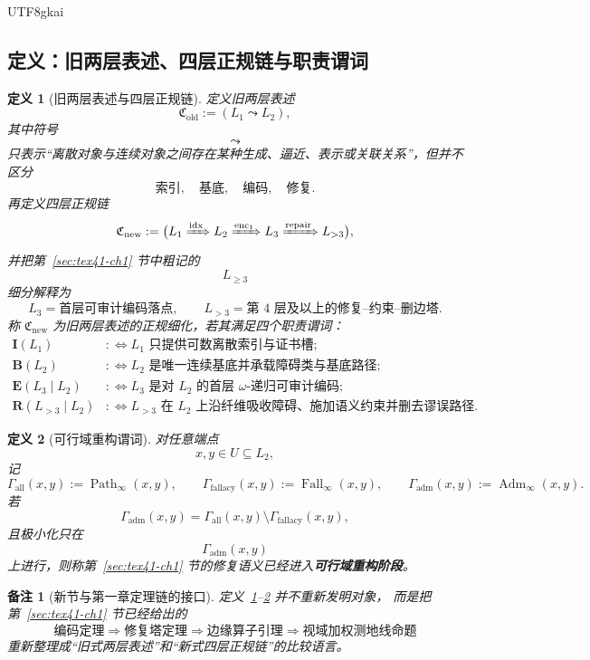 \documentclass[12pt]{article}
\newtheorem{definition}{定义}[section]
\newtheorem{remark}{备注}[section]
\newcommand{\Fall}{\operatorname{Fall}}
\newcommand{\Adm}{\operatorname{Adm}}
\newcommand{\Path}{\operatorname{Path}}
\begin{document}
\begin{CJK*}{UTF8}{gkai}
\subsection{定义：旧两层表述、四层正规链与职责谓词}
\label{subsec:tex41-upgrade-defs}

\begin{definition}[旧两层表述与四层正规链]
\label{def:tex41-upgrade-chain}
定义旧两层表述
\[
  \mathfrak C_{\mathrm{old}}
  :=
  (L_1\leadsto L_2),
\]
其中符号
\[
  \leadsto
\]
只表示“离散对象与连续对象之间存在某种生成、逼近、表示或关联关系”，但并不区分
\[
  \text{索引},\quad
  \text{基底},\quad
  \text{编码},\quad
  \text{修复}.
\]
再定义四层正规链
\[
  \mathfrak C_{\mathrm{new}}
  :=
  \bigl(
    L_1\xRightarrow{\mathrm{idx}}L_2
    \xRightarrow{\mathrm{enc}_1}L_3
    \xRightarrow{\mathrm{repair}}L_{>3}
  \bigr),
\]
并把第~\ref{sec:tex41-ch1} 节中粗记的
\[
  L_{\ge 3}
\]
细分解释为
\[
  L_3=\text{首层可审计编码落点},
  \qquad
  L_{>3}=\text{第 $4$ 层及以上的修复--约束--删边塔}.
\]
称 \(\mathfrak C_{\mathrm{new}}\) 为旧两层表述的正规细化，若其满足四个职责谓词：
\[
\begin{aligned}
  \mathbf I(L_1) &: \Longleftrightarrow L_1\text{ 只提供可数离散索引与证书槽};\\
  \mathbf B(L_2) &: \Longleftrightarrow L_2\text{ 是唯一连续基底并承载障碍类与基底路径};\\
  \mathbf E(L_3\mid L_2) &: \Longleftrightarrow L_3\text{ 是对 }L_2\text{ 的首层 }\omega\text{-递归可审计编码};\\
  \mathbf R(L_{>3}\mid L_2) &: \Longleftrightarrow L_{>3}\text{ 在 }L_2\text{ 上沿纤维吸收障碍、施加语义约束并删去谬误路径}.
\end{aligned}
\]
\end{definition}

\begin{definition}[可行域重构谓词]
\label{def:tex41-upgrade-adm}
对任意端点
\[
  x,y\in U\subseteq L_2,
\]
记
\[
  \Gamma_{\mathrm{all}}(x,y):=\Path_\infty(x,y),
  \qquad
  \Gamma_{\mathrm{fallacy}}(x,y):=\Fall_\infty(x,y),
  \qquad
  \Gamma_{\mathrm{adm}}(x,y):=\Adm_\infty(x,y).
\]
若
\[
  \Gamma_{\mathrm{adm}}(x,y)
  =
  \Gamma_{\mathrm{all}}(x,y)\setminus \Gamma_{\mathrm{fallacy}}(x,y),
\]
且极小化只在
\[
  \Gamma_{\mathrm{adm}}(x,y)
\]
上进行，则称第~\ref{sec:tex41-ch1} 节的修复语义已经进入\textbf{可行域重构阶段}。
\end{definition}

\begin{remark}[新节与第一章定理链的接口]
定义~\ref{def:tex41-upgrade-chain}--\ref{def:tex41-upgrade-adm} 并不重新发明对象，
而是把第~\ref{sec:tex41-ch1} 节已经给出的
\[
  \text{编码定理}
  \Longrightarrow
  \text{修复塔定理}
  \Longrightarrow
  \text{边缘算子引理}
  \Longrightarrow
  \text{视域加权测地线命题}
\]
重新整理成“旧式两层表述”和“新式四层正规链”的比较语言。
\end{remark}


\end{CJK*}
\end{document}
